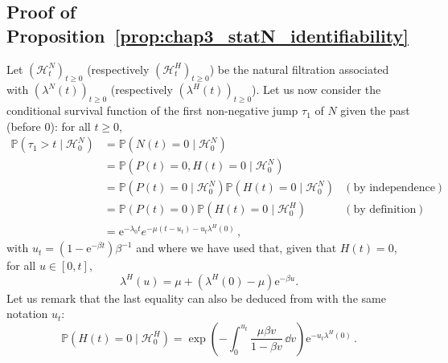 \begin{subappendices}
\section{Proof of Proposition~\ref{prop:chap3_statN_identifiability}}
\label{app:felix1}

Let $(\mathcal H_t^N)_{t \ge 0}$ (respectively $(\mathcal H_t^H)_{t \ge 0}$) be the natural filtration associated with $(\lambda^N(t))_{t\ge0}$ (respectively $(\lambda^H(t))_{t\ge0}$).
Let us now consider the conditional survival function of the first non-negative jump $\tau_1$ of $N$ given the past (before $0$):
for all $t \ge 0$,
\begin{align*}
  \mathbb P \left(\tau_1 > t \mid \mathcal H_0^N \right)
  &= \mathbb P \left(N(t) = 0 \mid \mathcal H_0^N \right)\\
  &= \mathbb P \left(P(t) = 0, H(t) = 0 \mid \mathcal H_0^N \right)\\
  &= \mathbb P \left(P(t) = 0 \mid \mathcal H_0^N \right) \mathbb P \left( H(t) = 0 \mid \mathcal H_0^N \right) & (\text{by independence})\\
  &= \mathbb P \left(P(t) = 0 \right) \mathbb P \left( H(t) = 0 \mid \mathcal H_0^H \right) & (\text{by definition})\\
  &= \mathrm e^{-\lambda_0 t} e^{- \mu \left( t - u_t \right) - u_t \lambda^H(0)} \,,
\end{align*}
  with $u_t = {(1 - \mathrm e^{-\beta t})}{\beta^{-1}}$ and
where we have used that,
given that $H(t) = 0$,
for all $u \in [0, t]$,
\[
\lambda^H (u) = \mu + \left( \lambda^H(0) - \mu \right) \mathrm e^{-\beta u}.
\]
Let us remark that the last equality can also be deduced from \textcite[Corollary~3.3]{Dassios2011} with the same notation $u_t$:
\[
\mathbb P \left( H(t) = 0 \mid \mathcal H_0^H \right) = \exp \left( - \int_0^{u_t} \frac{\mu\beta v}{1 - \beta v} \, \dd v \right) \mathrm e^{-u_t \lambda^H(0)} \,.
\]


\end{subappendices}
